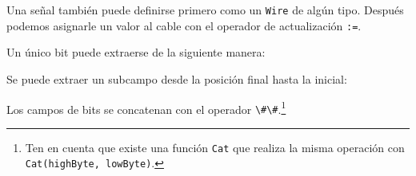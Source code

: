 \documentclass[%
    10pt,
    headinclude, footinclude=false,
    openright, %
    notitlepage,
    cleardoublepage=empty,
    headsepline,
    numbers=noenddot,
    bibliography=totoc, index=totoc,
    ]{scrbook}
\newcommand{\code}[1]{{\lstinline[basicstyle=\small\ttfamily]{#1}}}
\newcommand{\codefoot}[1]{{\lstinline[basicstyle=\footnotesize\ttfamily]{#1}}}
\newcommand{\myref}[2]{\href{#1}{#2}}
\renewcommand{\myref}[2]{{#2}{\footnote{\url{#1}}}}
\begin{document}

Una señal también puede definirse primero como un \code{Wire} de algún tipo. Después podemos asignarle
un valor al cable con el operador de actualización \code{:=}.



Un único bit puede extraerse de la siguiente manera:


\noindent Se puede extraer un subcampo desde la posición final hasta la inicial:



\noindent Los campos de bits se concatenan con el operador \code{\#\#}.\footnote{Ten en cuenta que existe una función \codefoot{Cat} que realiza la misma
operación con \codefoot{Cat(highByte, lowByte)}.}


\end{document}
